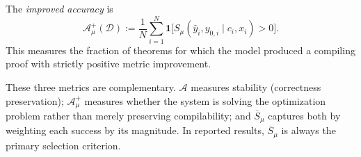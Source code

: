 \begin{definition}\label{def:imp_acc}
The \emph{improved accuracy} is
\[
\mathcal{A}^+_\mu(\mathcal{D}) := \frac{1}{N}\sum_{i=1}^{N}\mathbf{1}\bigl[S_\mu(\hat{y}_i, y_{0,i} \mid c_i, x_i) > 0\bigr].
\]
This measures the fraction of theorems for which the model produced a compiling proof with strictly positive metric improvement.
\end{definition}

\begin{remark}
These three metrics are complementary. $\mathcal{A}$ measures stability (correctness preservation); $\mathcal{A}^+_\mu$ measures whether the system is solving the optimization problem rather than merely preserving compilability; and $\overline{S}_\mu$ captures both by weighting each success by its magnitude. In reported results, $\overline{S}_\mu$ is always the primary selection criterion.
\end{remark}
